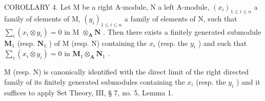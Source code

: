 COROLLARY 4. Let M be a right A-module, N a left A-module, \((x_{i})_{1\leqslant i\leqslant n}\) a family of elements of M, \((y_{i})_{1\leqslant i\leqslant n}\) a family of elements of N, such that \(\sum_{i}(x_{i}\otimes y_{i}) = 0\) in M \(\otimes_{\mathbf{A}}\mathbf{N}\) . Then there exists a finitely generated submodule \(\mathbf{M}_1\) (resp. \(\mathbf{N}_1\) ) of M (resp. N) containing the \(x_{i}\) (resp. the \(y_{i}\) ) and such that \(\sum_{i}(x_{i}\otimes y_{i}) = 0\) in \(\mathbf{M}_1\otimes_{\mathbf{A}}\mathbf{N}_1\) .

M (resp. N) is canonically identified with the direct limit of the right directed family of its finitely generated submodules containing the \(x_{i}\) (resp. the \(y_{i}\) ) and it suffices to apply Set Theory, III, § 7, no. 5, Lemma 1.

